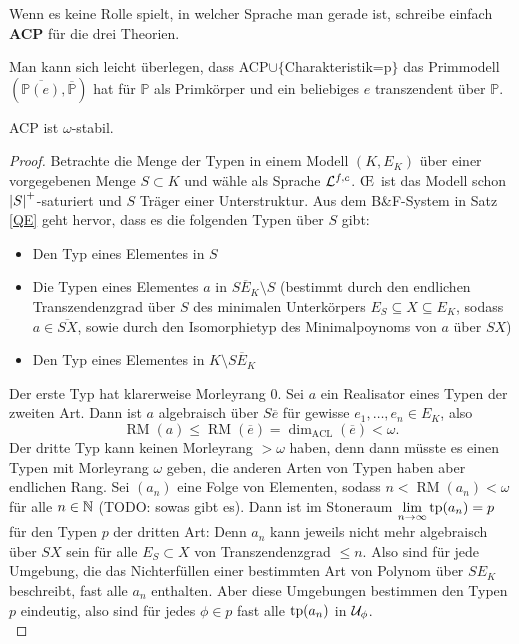     \begin{definition}
    	Wenn es keine Rolle spielt, in welcher Sprache man gerade ist, schreibe einfach \textbf{ACP} für die drei Theorien.
    \end{definition}
    
    \begin{corollary}
    	Man kann sich leicht überlegen, dass ACP$\cup\{$\glqq{}Charakteristik=p\grqq{}$\}$ das Primmodell $(\overline{\mathbb{P}(e)},\overline{\mathbb{P}})$ hat für $\mathbb{P}$ als Primkörper und ein beliebiges $e$ transzendent über $\mathbb{P}$.
    \end{corollary}
    
    \begin{theorem}
    	ACP ist $\omega$-stabil.
    \end{theorem}
    \begin{proof}
    	Betrachte die Menge der Typen in einem Modell $(K,E_K)$ über einer vorgegebenen Menge $S\subset K$ und wähle als Sprache $\mathcal{L}^{f,c}$. \OE\ ist das Modell schon ${\left| S \right|}^+$-saturiert und $S$ Träger einer Unterstruktur. Aus dem B\&F-System in Satz \ref{QE} geht hervor, dass es die folgenden Typen über $S$ gibt:
    	\begin{itemize}
    		\item Den Typ eines Elementes in $S$
    		\item Die Typen eines Elementes $a$ in $\overline{SE_K}\setminus S$ (bestimmt durch den endlichen Transzendenzgrad über $S$ des minimalen Unterkörpers $E_S\subseteq X\subseteq E_K$, sodass $a\in\overline{SX}$, sowie durch den Isomorphietyp des Minimalpoynoms von $a$ über $SX$)
    		\item Den Typ eines Elementes in $K\setminus\overline{SE_K}$
    	\end{itemize}
        Der erste Typ hat klarerweise Morleyrang 0. Sei $a$ ein Realisator eines Typen der zweiten Art. Dann ist $a$ algebraisch über $S\overline{e}$ für gewisse $e_1,\dots,e_n\in E_K$, also $$\operatorname{RM}(a)\leq\operatorname{RM}(\overline{e})=\dim_{\operatorname{ACL}}(\overline{e})<\omega.$$
        Der dritte Typ kann keinen Morleyrang $>\omega$ haben, denn dann müsste es einen Typen mit Morleyrang $\omega$ geben, die anderen Arten von Typen haben aber endlichen Rang. Sei $(a_n)$ eine Folge von Elementen, sodass $n<\operatorname{RM}(a_n)<\omega$ für alle $n\in\mathbb{N}$ (TODO: sowas gibt es). Dann ist im Stoneraum $\lim\limits_{n\rightarrow\infty}\operatorname{tp}(a_n)=p$ für den Typen $p$ der dritten Art: Denn $a_n$ kann jeweils nicht mehr algebraisch über $SX$ sein für alle $E_S\subset X$ von Transzendenzgrad $\leq n$. Also sind für jede Umgebung, die das Nichterfüllen einer bestimmten Art von Polynom über $SE_K$ beschreibt, fast alle $a_n$ enthalten. Aber diese Umgebungen bestimmen den Typen $p$ eindeutig, also sind für jedes $\phi\in p$ fast alle $\operatorname{tp}(a_n)$ in $\mathcal{U}_\phi$.\\

\end{proof}
